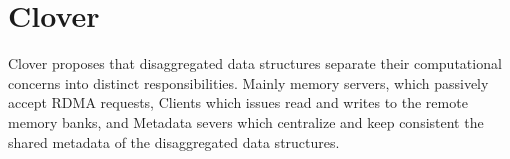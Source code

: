 

\section{Clover}


Clover proposes that disaggregated data structures separate their
computational concerns into distinct responsibilities. Mainly memory
servers, which passively accept RDMA requests, Clients which issues read and
writes to the remote memory banks, and Metadata severs which
centralize and keep consistent the shared metadata of the disaggregated
data structures.

